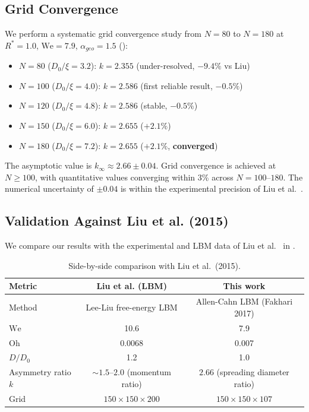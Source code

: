 \subsection{Grid Convergence}

We perform a systematic grid convergence study from $N=80$ to $N=180$ at $R^*=1.0$, $\mathrm{We}=7.9$, $\alpha_{geo}=1.5$ ():

\begin{itemize}
    \item $N=80$ ($D_0/\xi=3.2$): $k=2.355$ (under-resolved, $-9.4\%$ vs Liu)
    \item $N=100$ ($D_0/\xi=4.0$): $k=2.586$ (first reliable result, $-0.5\%$)
    \item $N=120$ ($D_0/\xi=4.8$): $k=2.586$ (stable, $-0.5\%$)
    \item $N=150$ ($D_0/\xi=6.0$): $k=2.655$ ($+2.1\%$)
    \item $N=180$ ($D_0/\xi=7.2$): $k=2.655$ ($+2.1\%$, \textbf{converged})
\end{itemize}

The asymptotic value is $k_\infty \approx 2.66 \pm 0.04$. Grid convergence is achieved at $N \geq 100$, with quantitative values converging within 3\% across $N=100$--$180$. The numerical uncertainty of $\pm 0.04$ is within the experimental precision of Liu et al.~\cite{liu2015symmetry}.

\subsection{Validation Against Liu et al. (2015)}

We compare our results with the experimental and LBM data of Liu et al.~\cite{liu2015symmetry} in .

\begin{table}[h]
\centering
\caption{Side-by-side comparison with Liu et al.~(2015).}
\label{tab:liu_comparison}
\begin{tabular}{l|cc}
\hline
Metric & Liu et al. (LBM) & This work \\
\hline
Method & Lee-Liu free-energy LBM & Allen-Cahn LBM (Fakhari 2017) \\
$\mathrm{We}$ & 10.6 & 7.9 \\
$\mathrm{Oh}$ & 0.0068 & 0.007 \\
$D/D_0$ & 1.2 & 1.0 \\
Asymmetry ratio $k$ & $\sim 1.5$--$2.0$ (momentum ratio) & $2.66$ (spreading diameter ratio) \\
Grid & $150 \times 150 \times 200$ & $150 \times 150 \times 107$ \\
\hline
\end{tabular}
\end{table}


